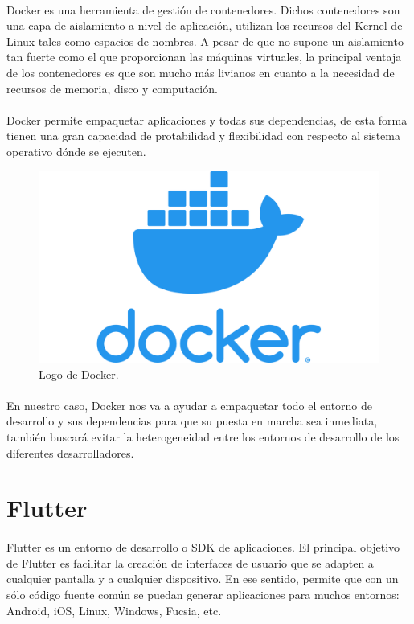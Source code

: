 \paragraph{}Docker es una herramienta de gestión de contenedores. Dichos contenedores son
una capa de aislamiento a nivel de aplicación, utilizan los recursos del Kernel de Linux
tales como espacios de nombres. A pesar de que no supone un aislamiento tan fuerte como
el que proporcionan las máquinas virtuales, la principal ventaja de los contenedores es
que son mucho más livianos en cuanto a la necesidad de recursos de memoria, disco y computación.
\cite{docker}

\paragraph{} Docker permite empaquetar aplicaciones y todas sus dependencias, de esta
forma tienen una gran capacidad de protabilidad y flexibilidad con respecto al sistema
operativo dónde se ejecuten.

\begin{figure}[H]
	\centering
	\includegraphics[width=0.50\linewidth]{imgs/docker-logo}
	\caption[Docker Logo]{Logo de Docker.}
	\label{fig:docker}
\end{figure}

\paragraph{} En nuestro caso, Docker nos va a ayudar a empaquetar todo el entorno de
desarrollo y sus dependencias para que su puesta en marcha sea inmediata, también buscará
evitar la heterogeneidad entre los entornos de desarrollo de los diferentes desarrolladores.


\section{Flutter}\label{sec:flutter}

\paragraph{} Flutter es un entorno de desarrollo o \gls{SDK} de aplicaciones. El principal
objetivo de Flutter es facilitar la creación de interfaces de usuario que se adapten a
cualquier pantalla y a cualquier dispositivo. En ese sentido, permite que con un sólo
código fuente común se puedan generar aplicaciones para muchos entornos: Android, iOS,
Linux, Windows, Fucsia, etc.
\cite{flutter}

